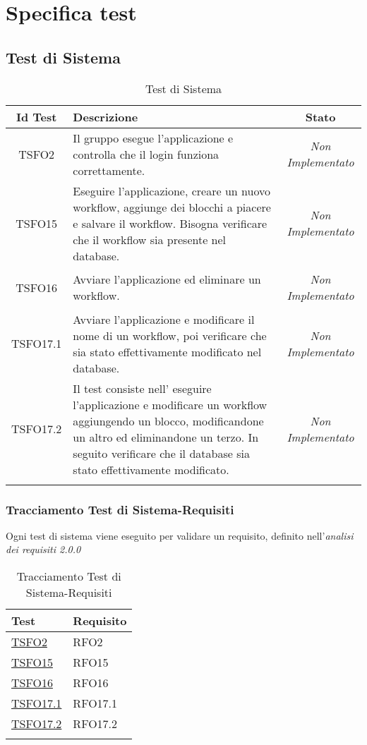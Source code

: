 \chapter{Specifica test}
\label{test}
\section{Test di Sistema}
\normalsize
\begin{longtable}{|c|>{}m{8cm}|c|}
\hline 
\textbf{Id Test} & \textbf{Descrizione} & \textbf{Stato}\\
\hline
\endhead
\hypertarget{TSFO2}{TSFO2} & Il gruppo esegue l'applicazione e controlla che il login funziona correttamente. & \textit{Non Implementato}\\ \hline
\hypertarget{TSFO15}{TSFO15} & Eseguire l'applicazione, creare un nuovo workflow, aggiunge dei blocchi a piacere e salvare il workflow. Bisogna verificare che il workflow sia presente nel database. & \textit{Non Implementato}\\ \hline
\hypertarget{TSFO16}{TSFO16} & Avviare l'applicazione ed eliminare un workflow. & \textit{Non Implementato}\\ \hline
\hypertarget{TSFO17.1}{TSFO17.1} & Avviare l'applicazione e modificare il nome di un workflow, poi verificare che sia stato effettivamente modificato nel database. & \textit{Non Implementato}\\ \hline
\hypertarget{TSFO17.2}{TSFO17.2} & Il test consiste nell' eseguire l'applicazione e modificare un workflow aggiungendo un blocco, modificandone un altro ed eliminandone un terzo. In seguito verificare che il database sia stato effettivamente modificato. & \textit{Non Implementato}\\ \hline
\caption[Test di Sistema]{Test di Sistema}
\label{tabella:test1}
\end{longtable}
\clearpage
\subsection{Tracciamento Test di Sistema-Requisiti}
Ogni test di sistema viene eseguito per validare un requisito, definito nell'\textit{analisi dei requisiti 2.0.0}
\normalsize
\begin{longtable}{|>{\centering}m{5cm}|m{5cm}<{\centering}|}
\hline
\textbf{Test} & \textbf{Requisito}\\
\hline
\endhead
\hyperlink{TSFO2}{TSFO2} & RFO2\\ \hline
\hyperlink{TSFO15}{TSFO15} & RFO15\\ \hline
\hyperlink{TSFO16}{TSFO16} & RFO16\\ \hline
\hyperlink{TSFO17.1}{TSFO17.1} & RFO17.1\\ \hline
\hyperlink{TSFO17.2}{TSFO17.2} & RFO17.2\\ \hline
\caption[Tracciamento Test di Sistema-Requisiti]{Tracciamento Test di Sistema-Requisiti}
\label{tabella:ts-requi}
\end{longtable}

